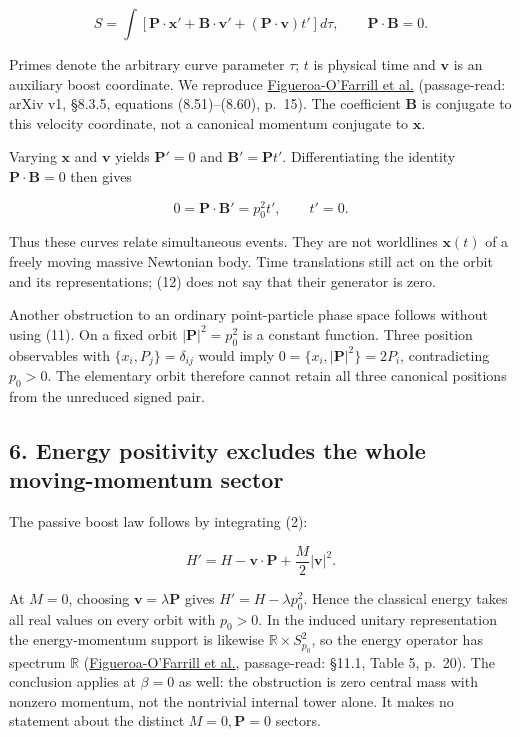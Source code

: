 \documentclass[11pt,a4paper]{article}
\begin{document}
\[
S=\int\left[\mathbf P\cdot\mathbf x'
+\mathbf B\cdot\mathbf v'+(\mathbf P\cdot\mathbf v)t'\right]d\tau,
\qquad \mathbf P\cdot\mathbf B=0. \tag{11}
\]

Primes denote the arbitrary curve parameter \(\tau\); \(t\) is physical
time and \(\mathbf v\) is an auxiliary boost coordinate. We reproduce
\href{https://arxiv.org/pdf/2401.03241v1}{Figueroa-O'Farrill et al.}
(passage-read: arXiv v1, §8.3.5, equations (8.51)--(8.60), p.~15). The
coefficient \(\mathbf B\) is conjugate to this velocity coordinate, not
a canonical momentum conjugate to \(\mathbf x\).

Varying \(\mathbf x\) and \(\mathbf v\) yields \(\mathbf P'=0\) and
\(\mathbf B'=\mathbf P t'\). Differentiating the identity
\(\mathbf P\cdot\mathbf B=0\) then gives

\[
0=\mathbf P\cdot\mathbf B'=p_0^2t',\qquad t'=0. \tag{12}
\]

Thus these curves relate simultaneous events. They are not worldlines
\(\mathbf x(t)\) of a freely moving massive Newtonian body. Time
translations still act on the orbit and its representations; (12) does
not say that their generator is zero.

Another obstruction to an ordinary point-particle phase space follows
without using (11). On a fixed orbit \(|\mathbf P|^2=p_0^2\) is a
constant function. Three position observables with
\(\{x_i,P_j\}=\delta_{ij}\) would imply
\(0=\{x_i,|\mathbf P|^2\}=2P_i\), contradicting \(p_0>0\). The
elementary orbit therefore cannot retain all three canonical positions
from the unreduced signed pair.

\hypertarget{energy-positivity-excludes-the-whole-moving-momentum-sector}{%
\subsection{6. Energy positivity excludes the whole moving-momentum
sector}\label{energy-positivity-excludes-the-whole-moving-momentum-sector}}

The passive boost law follows by integrating (2):

\[
H'=H-\mathbf v\cdot\mathbf P+\frac M2|\mathbf v|^2. \tag{13}
\]

At \(M=0\), choosing \(\mathbf v=\lambda\mathbf P\) gives
\(H'=H-\lambda p_0^2\). Hence the classical energy takes all real values
on every orbit with \(p_0>0\). In the induced unitary representation the
energy-momentum support is likewise \(\mathbb R\times S^2_{p_0}\), so
the energy operator has spectrum \(\mathbb R\)
(\href{https://arxiv.org/pdf/2401.03241v1}{Figueroa-O'Farrill et al.},
passage-read: §11.1, Table 5, p.~20). The conclusion applies at
\(\beta=0\) as well: the obstruction is zero central mass with nonzero
momentum, not the nontrivial internal tower alone. It makes no statement
about the distinct \(M=0,\mathbf P=0\) sectors.
\end{document}
